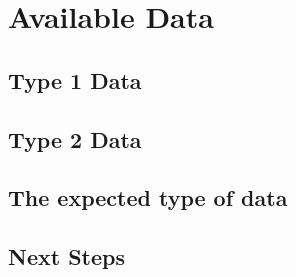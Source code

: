 \chapter{Available Data}
\label{cha:available_data}


\section{Type 1 Data} %
\label{sec:type_1_data}

\section{Type 2 Data} %
\label{sec:type_2_data}

\section{The expected type of data}
\label{sec:expected_data}

\section{Next Steps} %
\label{sec:available_data_next_steps}
